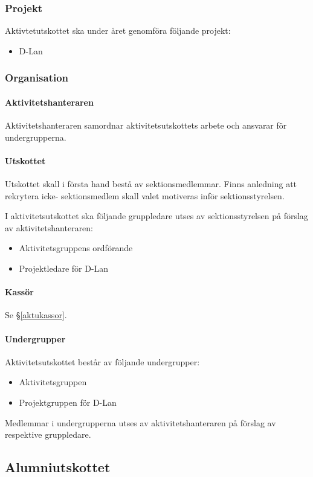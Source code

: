 \documentclass{datateknologsektionen-document}
\begin{document}
\subsubsection{Projekt}
Aktivtetutskottet ska under året genomföra följande projekt:
\begin{itemize}
  \item D-Lan
\end{itemize}
\subsubsection{Organisation}
\paragraph{Aktivitetshanteraren}
Aktivitetshanteraren samordnar aktivitetsutskottets arbete och ansvarar för undergrupperna.
\paragraph{Utskottet}

Utskottet skall i första hand bestå av sektionsmedlemmar. Finns anledning att rekrytera icke-
sektionsmedlem skall valet motiveras inför sektionsstyrelsen.

I aktivitetsutskottet ska följande gruppledare utses av sektionsstyrelsen på förslag
av aktivitetshanteraren:
\begin{itemize}
  \item Aktivitetsgruppens ordförande
  \item Projektledare för D-Lan
\end{itemize}

\paragraph{Kassör}
Se \S \ref{aktukassor}.

\paragraph{Undergrupper}
Aktivitetsutskottet består av följande undergrupper:
\begin{itemize}
  \item Aktivitetsgruppen
  \item Projektgruppen för D-Lan
\end{itemize}
Medlemmar i undergrupperna utses av aktivitetshanteraren på förslag av respektive gruppledare.

\subsection{Alumniutskottet}
\label{alumni}
\end{document}
